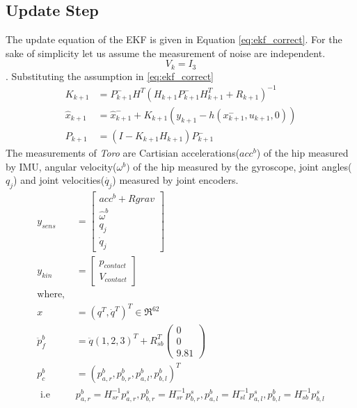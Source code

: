 \begin{enumerate}
\section{Update Step}
The update equation of the EKF is given in Equation \ref{eq:ekf_correct}. For the sake of simplicity let us assume the measurement of noise are independent. $$V_k = I_3$$. Substituting the assumption in \ref{eq:ekf_correct}
\begin{equation}
\label{eq:correct}
\begin{split}
K_{k+1} &= P_{k+1}^-H^T(H_{k+1}P_{k+1}^-H_{k+1}^T + R_{k+1})^{-1}\\
\hat{x}_{k+1} &= \hat{x}_{k+1}^- + K_{k+1}(y_{k+1}-h(x_{k+1}^-,u_{k+1},0))\\
P_{k+1} &= (I- K_{k+1}H_{k+1})P_{k+1}^-
\end{split}
\end{equation}
The measurements of \emph{Toro} are Cartisian accelerations($acc^b$) of the hip measured by IMU, angular velocity($\omega^b)$ of the hip measured by the gyroscope, joint angles($q_j$) and joint velocities($\dot{q_j}$) measured by joint encoders.
\begin{equation}
\begin{split}
     y_{sens} &= 
	\begin{bmatrix}
	acc^b+R grav \\ \hat{\omega}^{b}\\ q_{j} \\ \dot{q}_{j} 
	\end{bmatrix}\\
    y_{kin} &=
    \begin{bmatrix}
    p_{contact} \\ V_{contact}
    \end{bmatrix}
	\\ \text{where, }\\ x &= (q^{T},\dot{q}^{T})^{T} \in \Re^{62}\\
	\ddot{p}_{f}^{b} &= \ddot{q}(1,2,3)^{T} + R_{sb}^{T} 
	\begin{pmatrix}
	0 \\ 0 \\ 9.81
	\end{pmatrix}\\
	p_{c}^{b} &= (p_{a,r}^{b}, p_{b,r}^{b}, p_{a,l}^{b}, p_{b,l}^{b} )^{T} \\
	 \text{ i.e } &p_{a,r}^{b} = H_{sr}^{-1} p_{a,r}^{s},p_{b,r}^{b} = H_{sr}^{-1} p_{b,r}^{s},p_{a,l}^{b} = H_{sl}^{-1} p_{a,l}^{s},p_{b,l}^{b} = H_{sb}^{-1} p_{b,l}^{s}  \\

\end{split}
\end{equation}
\end{enumerate}
